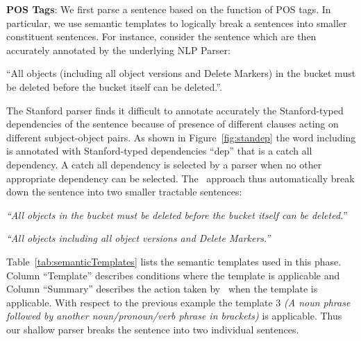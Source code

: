 \textbf{POS Tags}: We first parse a sentence based on the function of POS tags. 
In particular, we use semantic templates to logically break a sentences into smaller constituent sentences. 
For instance, consider the sentence which are then accurately annotated by the underlying NLP Parser:

\begin{center}
\scriptsize``All objects (including all object versions and Delete Markers) in the bucket must be deleted before the bucket itself can be deleted.''. \normalsize
\end{center}

The Stanford parser finds it difficult to annotate accurately the Stanford-typed dependencies of the sentence because of presence of different clauses acting on different subject-object pairs.
As shown in Figure~\ref{fig:standep} the word including is annotated with Stanford-typed dependencies ``dep'' that is a catch all dependency. A catch all dependency is selected by a parser when no other appropriate dependency can be selected.
The \tool\ approach thus automatically break down the sentence into two smaller tractable sentences:

\begin{center}
\scriptsize \textit{``All objects in the bucket must be deleted before the bucket itself can be deleted.}''
	
\textit{``All objects including all object versions and Delete Markers.''}\normalsize 
\end{center} 


Table~\ref{tab:semanticTemplates} lists the semantic templates used in this phase.
Column ``Template'' describes conditions where the template is applicable and Column ``Summary'' describes the action taken by \tool\ when the template is applicable.
With respect to the previous example the template 3 \textit{(A noun phrase followed by another noun/pronoun/verb phrase in brackets)} is applicable.
Thus our shallow parser breaks the sentence into two individual sentences.
	 
